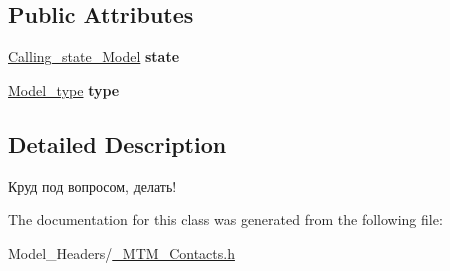 \subsection*{Public Attributes}
\begin{DoxyCompactItemize}
\item 
\mbox{\label{class_m_t_m___contacts_aef73bf2af245e7c0ac9ccd4d7dc15ea7}} 
\mbox{\hyperlink{___m_t_m___contacts_8h_aa7247167838f5ce0b5f433b20ee4b5b6}{Calling\+\_\+state\+\_\+\+Model}} {\bfseries state}
\item 
\mbox{\label{class_m_t_m___contacts_aef45d67d70db7a8fa1779cd92b93e8c3}} 
\mbox{\hyperlink{___m_t_m___contacts_8h_aa524f32b416bdc771351ee8a1ff592b6}{Model\+\_\+type}} {\bfseries type}
\end{DoxyCompactItemize}


\subsection{Detailed Description}
Круд под вопросом, делать! 

The documentation for this class was generated from the following file\+:\begin{DoxyCompactItemize}
\item 
Model\+\_\+\+Headers/\mbox{\hyperlink{___m_t_m___contacts_8h}{\+\_\+\+M\+T\+M\+\_\+\+Contacts.\+h}}\end{DoxyCompactItemize}
